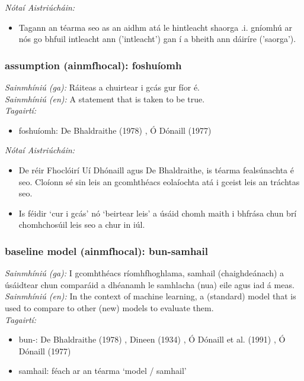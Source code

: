  \noindent \textit{Nótaí Aistriúcháin:}
\begin{itemize}
	\item Tagann an téarma seo as an aidhm atá le hintleacht shaorga .i. gníomhú ar nós go bhfuil intleacht ann ('intleacht') gan í a bheith ann dáiríre ('saorga').
\end{itemize}


\subsubsection*{assumption (ainmfhocal): foshuíomh}
 \noindent \textit{Sainmhíniú (ga):} Ráiteas a chuirtear i gcás gur fíor é.
\\
 \noindent \textit{Sainmhíniú (en):} A statement that is taken to be true.
\\
 \noindent \textit{Tagairtí:}
\begin{itemize}
	\item foshuíomh: De Bhaldraithe (1978) \cite{de-bhaldraithe}, Ó Dónaill (1977) \cite{odonaill}
\end{itemize}

 \noindent \textit{Nótaí Aistriúcháin:}
\begin{itemize}
	\item De réir Fhoclóirí Uí Dhónaill agus De Bhaldraithe, is téarma fealsúnachta é seo. Cloíonn sé sin leis an gcomhthéacs eolaíochta atá i gceist leis an tráchtas seo.
	\item Is féidir `cur i gcás' nó `beirtear leis' a úsáid chomh maith i bhfrása chun brí chomhchosúil leis seo a chur in iúl.
\end{itemize}


\subsubsection*{baseline model (ainmfhocal): bun-samhail}
 \noindent \textit{Sainmhíniú (ga):} I gcomhthéacs ríomhfhoghlama, samhail (chaighdeánach) a úsáidtear chun comparáid a dhéanamh le samhlacha (nua) eile agus iad á meas.
\\
 \noindent \textit{Sainmhíniú (en):} In the context of machine learning, a (standard) model that is used to compare to other (new) models to evaluate them.
\\
 \noindent \textit{Tagairtí:}
\begin{itemize}
	\item bun-: De Bhaldraithe (1978) \cite{de-bhaldraithe}, Dineen (1934) \cite{dineen}, Ó Dónaill et al. (1991) \cite{focloir-beag}, Ó Dónaill (1977) \cite{odonaill}
	\item samhail: féach ar an téarma `model / samhail'
\end{itemize}

